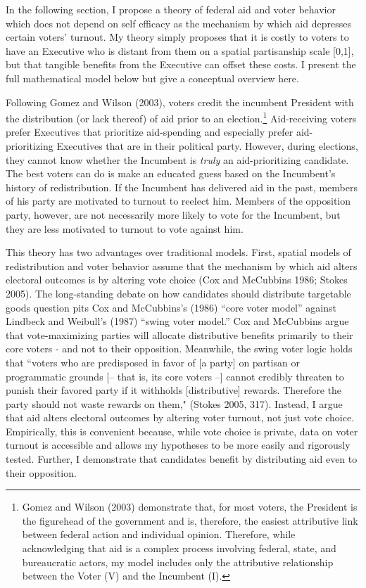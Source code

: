\documentclass[12pt]{paper}
\begin{document}
In the following section, I propose a theory of federal aid and voter behavior which does not depend on self efficacy as the mechanism by which aid depresses certain voters' turnout. My theory simply proposes that it is costly to voters to have an Executive who is distant from them on a spatial partisanship scale [0,1], but that tangible benefits from the Executive can offset these costs. I present the full mathematical model below but give a conceptual overview here. 

Following Gomez and Wilson (2003), voters credit the incumbent President with the distribution (or lack thereof) of aid prior to an election.\footnote{Gomez and Wilson (2003) demonstrate that, for most voters, the President is the figurehead of the government and is, therefore, the easiest attributive link between federal action and individual opinion. Therefore, while acknowledging that aid is a complex process involving federal, state, and bureaucratic actors, my model includes only the attributive relationship between the Voter (V) and the Incumbent (I).} Aid-receiving voters prefer Executives that prioritize aid-spending and especially prefer aid-prioritizing Executives that are in their political party. However, during elections, they cannot know whether the Incumbent is \textit{truly} an aid-prioritizing candidate. The best voters can do is make an educated guess based on the Incumbent's history of redistribution. If the Incumbent has delivered aid in the past, members of his party are motivated to turnout to reelect him. Members of the opposition party, however, are not necessarily more likely to vote for the Incumbent, but they are less motivated to turnout to vote against him.

This theory has two  advantages over traditional models. First, spatial models of redistribution and voter behavior assume that the mechanism by which aid alters electoral outcomes is by altering vote choice (Cox and McCubbins 1986; Stokes 2005). The long-standing debate on how candidates should distribute targetable goods question pits Cox and McCubbins's (1986) ``core voter model” against Lindbeck and Weibull's (1987) ``swing voter model.” Cox and McCubbins argue that vote-maximizing parties will allocate distributive benefits primarily to their core voters - and not to their opposition. Meanwhile, the swing voter logic holds that ``voters who are predisposed in favor of [a party] on partisan or programmatic grounds [– that is, its core voters –] cannot credibly threaten to punish their favored party if it withholds [distributive] rewards. Therefore the party should not waste rewards on them," (Stokes 2005, 317). Instead, I argue that aid alters electoral outcomes by altering voter turnout, not just vote choice. Empirically, this is convenient because, while vote choice is private, data on voter turnout is  accessible and allows my hypotheses to be more easily and rigorously tested. Further, I demonstrate that candidates benefit by distributing aid even to their opposition.
\end{document}
